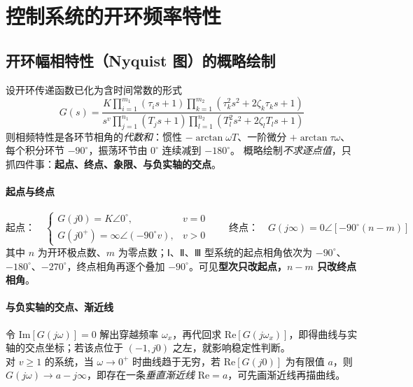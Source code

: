 \bigskip

\section{控制系统的开环频率特性}

\subsection{开环幅相特性（Nyquist 图）的概略绘制}
设开环传递函数已化为含时间常数的形式
{\small
\[
G(s)=\frac{K\prod_{i=1}^{m_1}(\tau_is+1)\prod_{k=1}^{m_2}(\tau_k^2s^2+2\zeta_k\tau_ks+1)}
{s^{v}\prod_{j=1}^{n_1}(T_js+1)\prod_{l=1}^{n_2}(T_l^2s^2+2\zeta_lT_ls+1)}
\]
}
则相频特性是各环节相角的\emph{代数和}：惯性 $-\arctan\omega T$、一阶微分 $+\arctan\tau\omega$、每个积分环节 $-90^\circ$，振荡环节由 $0^\circ$ 连续减到 $-180^\circ$。
概略绘制\emph{不求逐点值}，只抓四件事：\textbf{起点、终点、象限、与负实轴的交点}。

\paragraph{起点与终点}
\[
\text{起点：}\quad
\begin{cases}
G(j0)=K\angle0^\circ, & v=0\\[2pt]
G(j0^+)=\infty\angle(-90^\circ v), & v>0
\end{cases}
\qquad
\text{终点：}\quad G(j\infty)=0\angle[-90^\circ(n-m)]
\]
其中 $n$ 为开环极点数、$m$ 为零点数；Ⅰ、Ⅱ、Ⅲ 型系统的起点相角依次为 $-90^\circ$、$-180^\circ$、$-270^\circ$，终点相角再逐个叠加 $-90^\circ$。可见\textbf{型次只改起点，$n-m$ 只改终点相角}。

\paragraph{与负实轴的交点、渐近线}
令 $\mathrm{Im}[G(j\omega)]=0$ 解出穿越频率 $\omega_x$，再代回求 $\mathrm{Re}[G(j\omega_x)]$，即得曲线与实轴的交点坐标；若该点位于 $(-1,j0)$ 之左，就影响稳定性判断。\\
对 $v\ge1$ 的系统，当 $\omega\to0^+$ 时曲线趋于无穷，若 $\mathrm{Re}[G(j0)]$ 为有限值 $a$，则 $G(j\omega)\to a-j\infty$，即存在一条\emph{垂直渐近线} $\mathrm{Re}=a$，可先画渐近线再描曲线。

